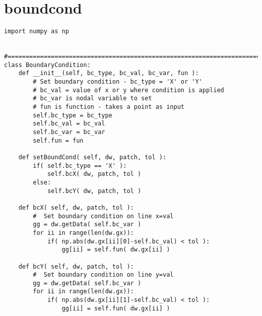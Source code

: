 \documentclass[11pt,fleqn]{book} %
\begin{document}
\chapter{boundcond}
\label{chap:boundcond}
\begin{lstlisting}
import numpy as np


#===============================================================================
class BoundaryCondition:
    def __init__(self, bc_type, bc_val, bc_var, fun ):
        # Set boundary condition - bc_type = 'X' or 'Y'
        # bc_val = value of x or y where condition is applied
        # bc_var is nodal variable to set
        # fun is function - takes a point as input
        self.bc_type = bc_type
        self.bc_val = bc_val
        self.bc_var = bc_var
        self.fun = fun
        
    def setBoundCond( self, dw, patch, tol ):
        if( self.bc_type == 'X' ):
            self.bcX( dw, patch, tol )
        else:
            self.bcY( dw, patch, tol )
        
    def bcX( self, dw, patch, tol ):
        #  Set boundary condition on line x=val
        gg = dw.getData( self.bc_var )
        for ii in range(len(dw.gx)):
            if( np.abs(dw.gx[ii][0]-self.bc_val) < tol ):
                gg[ii] = self.fun( dw.gx[ii] )
                
    def bcY( self, dw, patch, tol ):
        #  Set boundary condition on line y=val
        gg = dw.getData( self.bc_var )
        for ii in range(len(dw.gx)):
            if( np.abs(dw.gx[ii][1]-self.bc_val) < tol ):
                gg[ii] = self.fun( dw.gx[ii] )                
\end{lstlisting}
\end{document}

